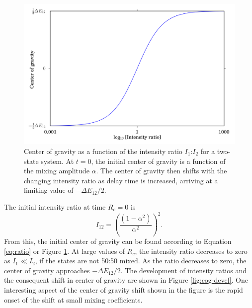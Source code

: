 \documentclass[12pt,draft]{mitthesis}
\begin{document}
\begin{figure}
  \caption{Center of gravity as a function of the intensity ratio
    $I_1$:$I_2$ for a two-state system.  At $t=0$, the initial center
    of gravity is a function of the mixing amplitude $\alpha$.  The
    center of gravity then shifts with the changing intensity ratio as
    delay time is increased, arriving at a limiting value of $-\Delta
    E_{12}/2$.}
  \label{fig:ratio}
  \centering
  \includegraphics[width=6in]{cog-from-ratio.png}
\end{figure}

The initial intensity ratio at time $R_c=0$ is
\begin{equation}
  I_{12} = 
  \left(
    \frac{(1 - \alpha^2)}{\alpha^2}
  \right)^2.
\end{equation}
From this, the initial center of gravity can be found according to
Equation \ref{eq:ratio} or Figure \ref{fig:ratio}.  At large values of
$R_c$, the intensity ratio decreases to zero as $I_1 \ll I_2$, if the
states are not 50:50 mixed.  As the ratio decreases to zero, the
center of gravity approaches $-\Delta E_{12} / 2$.  The development of
intensity ratios and the consequent shift in center of gravity are
shown in Figure \ref{fig:cog-devel}.  One interesting aspect of the
center of gravity shift shown in the figure is the rapid onset of the
shift at small mixing coefficients.
\end{document}
